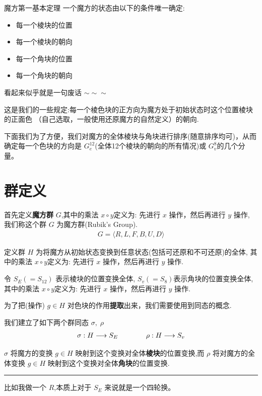 \documentclass{beamer}
\newcommand{\lr}{\ensuremath{\longrightarrow}}
\begin{document}
\begin{frame}{魔方第一基本定理}
一个魔方的状态由以下的条件唯一确定:
\begin{multicols}{2}
    \begin{itemize}
        \item 每一个棱块的位置
        \item 每一个棱块的朝向
        \item 每一个角块的位置
        \item 每一个角块的朝向
    \end{itemize}
\end{multicols}

看起来似乎就是一句废话 $\sim\sim\sim$
\end{frame} 

\begin{frame}
这是我们的一些规定:每一个棱色块的正方向为魔方处于初始状态时这个位置棱块的正面色
（自己选取，一般使用还原魔方的自然定义）的朝向.

下面我们为了方便，我们对魔方的全体棱块与角块进行排序(随意排序均可)，从而确定每一个色块的方向是
$G_{e}^{12}$(全体12个棱块的朝向的所有情况)或 $G_v^{8}$的几个分量。
\end{frame} 




\section{群定义}
\begin{frame}
    首先定义{\bf 魔方群} $G$,其中的乘法 $x\circ y$定义为: 先进行 $x$ 操作，然后再进行 $y$ 操作,
我们称这个群 $G$ 为魔方群(Rubik's Group).
\begin{align}
    G = \langle R, L, F, B, U, D\rangle
\end{align}

定义群 $H$ 为将魔方从初始状态变换到任意状态(包括可还原和不可还原)的全体,
其中的乘法 $x\circ y$定义为: 先进行 $x$ 操作，然后再进行 $y$ 操作.
\end{frame} 

\begin{frame}
令 $S_E(=S_{12})$ 表示棱块的位置变换全体, $S_v(=S_8)$表示角块的位置变换全体,
其中的乘法 $x\circ y$定义为: 先进行 $x$ 操作，然后再进行 $y$ 操作.

为了把(操作) $g\in H$ 对色块的作用{\bf 提取}出来，我们需要使用到同态的概念.
\end{frame} 
\begin{frame}
我们建立了如下两个群同态 $\sigma,\; \rho$
\begin{align}
    \sigma: H \lr S_E
    \hspace*{4em}
    \rho: H \lr S_v   
\end{align}

$\sigma$ 将魔方的变换 $g\in H$ 映射到这个变换对全体{\bf 棱块}的位置变换,而
$\rho$ 将对魔方的全体变换 $g\in H$ 映射到这个变换对全体{\bf 角块}的位置变换.

\vspace*{4em}
\noindent\rule{1\linewidth}{2pt}
{
    \kaishu
    比如我做一个 $R$,本质上对于 $S_E$ 来说就是一个四轮换。
}
\end{frame} 
\end{document}
